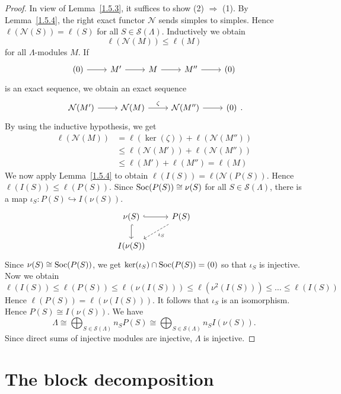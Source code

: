 \begin{proof}
In view of Lemma~\ref{1.5.3}, it suffices to show (2) $\Rightarrow$ (1). By Lemma~\ref{1.5.4}, the right exact functor $\mathcal N$ sends simples to simples. Hence $\ell(\mathcal N(S))=\ell(S)$ for all $S\in\mathcal S(\Lambda)$. Inductively we obtain
\[
\ell(\mathcal N(M)) \le \ell(M)
\]
for all $\Lambda$-modules $M$. If
\[
\begin{tikzcd}
	(0) \ar[r] & M' \ar[r] & M \ar[r] & M'' \ar[r] & (0)
\end{tikzcd}
\]
is an exact sequence, we obtain an exact sequence
\[
\begin{tikzcd}
	\mathcal N(M') \ar[r] & \mathcal N(M) \ar[r,"\zeta"] & \mathcal N(M'') \ar[r] & (0)
\end{tikzcd}.
\]
By using the inductive hypothesis, we get
\begin{align*}
\ell(\mathcal N(M))
& = \ell(\ker(\zeta)) + \ell(\mathcal N(M'')) \\
& \le \ell(\mathcal N(M')) + \ell(\mathcal N(M'')) \\
& \le \ell(M') + \ell(M'') = \ell(M)
\end{align*}
%
We now apply Lemma~\ref{1.5.4} to obtain $\ell(I(S))=\ell(\mathcal N(P(S))$. Hence $\ell(I(S)) \le \ell(P(S))$. Since $\operatorname{Soc}(P(S))\cong \nu(S)$ for all $S\in\mathcal S(\Lambda)$, there is a map $\iota_S:P(S)\hookrightarrow I(\nu(S))$.
%
\[
\begin{tikzcd}
	\nu(S) \ar[r,hook] \ar[d,hook] & P(S) \ar[dl,dashed,"\iota_S"] \\
	I(\nu(S)) &
\end{tikzcd}
\]
%
Since $\nu(S)\cong \operatorname{Soc}(P(S))$, we get $\ker(\iota_S)\cap \operatorname{Soc}(P(S))=(0)$ so that $\iota_S$ is injective. Now we obtain
\[
\ell(I(S))
 \le \ell(P(S))
 \le \ell(\nu(I(S)))
 \le \ell(\nu^2(I(S)))
 \le \dots
 \le \ell(I(S))
\]
Hence $\ell(P(S)) = \ell(\nu(I(S)))$. It follows that $\iota_S$ is an isomorphism. Hence $P(S)\cong I(\nu(S))$. We have
\[
\Lambda \cong \bigoplus_{S\in\mathcal S(\Lambda)} n_S P(S) \cong \bigoplus_{S\in\mathcal S(\Lambda)} n_S I(\nu(S)). 
\]
Since direct sums of injective modules are injective, $\Lambda$ is injective.
\end{proof}


\section{The block decomposition}

